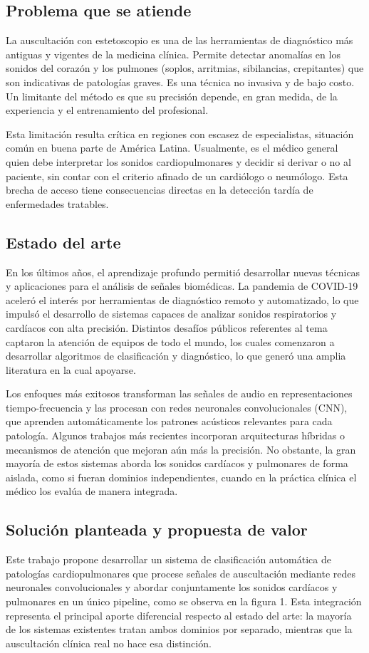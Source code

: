 \documentclass[
11pt, %
]{charter}
\begin{document}
\subsection{Problema que se atiende}
La auscultación con estetoscopio es una de las herramientas de diagnóstico más antiguas y vigentes de la medicina clínica.
Permite detectar anomalías en los sonidos del corazón y los pulmones (soplos, arritmias, sibilancias, crepitantes) que son indicativas de patologías graves. 
Es una técnica no invasiva y de bajo costo. Un limitante del método es que su precisión depende, en gran medida, de la experiencia y el entrenamiento del profesional.

Esta limitación resulta crítica en regiones con escasez de especialistas, situación común en buena parte de América Latina. 
Usualmente, es el médico general quien debe interpretar los sonidos cardiopulmonares y decidir si derivar o no al paciente, sin contar 
con el criterio afinado de un cardiólogo o neumólogo. Esta brecha de acceso tiene consecuencias directas en la detección tardía de enfermedades tratables.

\subsection{Estado del arte}
En los últimos años, el aprendizaje profundo permitió desarrollar nuevas técnicas y aplicaciones para el análisis de señales biomédicas.
La pandemia de COVID-19 aceleró el interés por herramientas de diagnóstico remoto y automatizado, lo que impulsó el desarrollo de sistemas capaces 
de analizar sonidos respiratorios y cardíacos con alta precisión. Distintos desafíos públicos referentes al tema captaron la atención de equipos 
de todo el mundo, los cuales comenzaron a desarrollar algoritmos de clasificación y diagnóstico, lo que generó una amplia literatura en la cual apoyarse.

Los enfoques más exitosos transforman las señales de audio en representaciones tiempo-frecuencia y las procesan con redes neuronales 
convolucionales (CNN), que aprenden automáticamente los patrones acústicos relevantes para cada patología. Algunos trabajos más recientes incorporan 
arquitecturas híbridas o mecanismos de atención que mejoran aún más la precisión. No obstante, la gran mayoría de estos sistemas aborda los sonidos 
cardíacos y pulmonares de forma aislada, como si fueran dominios independientes, cuando en la práctica clínica el médico los evalúa de manera integrada.

\subsection{Solución planteada y propuesta de valor}
Este trabajo propone desarrollar un sistema de clasificación automática de patologías cardiopulmonares que procese señales de auscultación 
mediante redes neuronales convolucionales y abordar conjuntamente los sonidos cardíacos y pulmonares en un único pipeline, como se observa en la figura 1. 
Esta integración representa el principal aporte diferencial respecto al estado del arte: la mayoría de los sistemas existentes tratan ambos dominios 
por separado, mientras que la auscultación clínica real no hace esa distinción.
\end{document}
